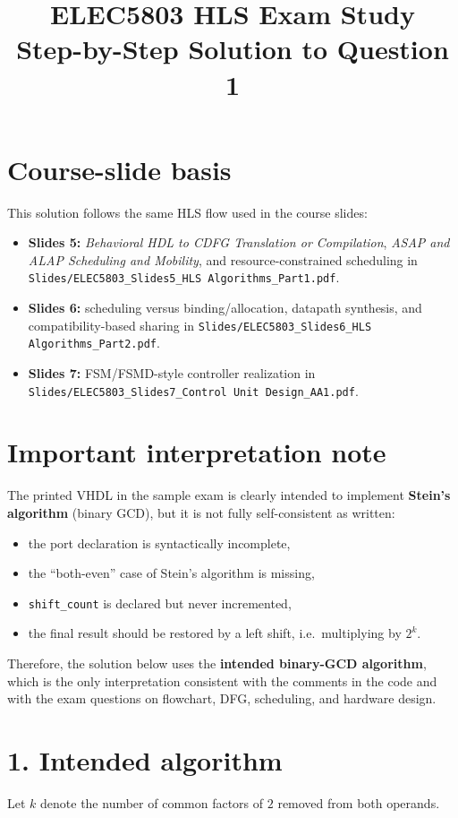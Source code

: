 \documentclass[11pt,a4paper]{article}
\title{ELEC5803 HLS Exam Study\\Step-by-Step Solution to Question 1}
\author{}
\date{}
\begin{document}
\maketitle

\section*{Course-slide basis}
This solution follows the same HLS flow used in the course slides:
\begin{itemize}
  \item \textbf{Slides 5:} \emph{Behavioral HDL to CDFG Translation or Compilation}, \emph{ASAP and ALAP Scheduling and Mobility}, and resource-constrained scheduling in \texttt{Slides/ELEC5803\_Slides5\_HLS Algorithms\_Part1.pdf}.
  \item \textbf{Slides 6:} scheduling versus binding/allocation, datapath synthesis, and compatibility-based sharing in \texttt{Slides/ELEC5803\_Slides6\_HLS Algorithms\_Part2.pdf}.
  \item \textbf{Slides 7:} FSM/FSMD-style controller realization in \texttt{Slides/ELEC5803\_Slides7\_Control Unit Design\_AA1.pdf}.
\end{itemize}

\section*{Important interpretation note}
The printed VHDL in the sample exam is clearly intended to implement \textbf{Stein's algorithm} (binary GCD), but it is not fully self-consistent as written:
\begin{itemize}
  \item the port declaration is syntactically incomplete,
  \item the ``both-even'' case of Stein's algorithm is missing,
  \item \texttt{shift\_count} is declared but never incremented,
  \item the final result should be restored by a left shift, i.e.\ multiplying by $2^{k}$.
\end{itemize}
Therefore, the solution below uses the \textbf{intended binary-GCD algorithm}, which is the only interpretation consistent with the comments in the code and with the exam questions on flowchart, DFG, scheduling, and hardware design.

\section*{1. Intended algorithm}
Let $k$ denote the number of common factors of $2$ removed from both operands.
\end{document}
